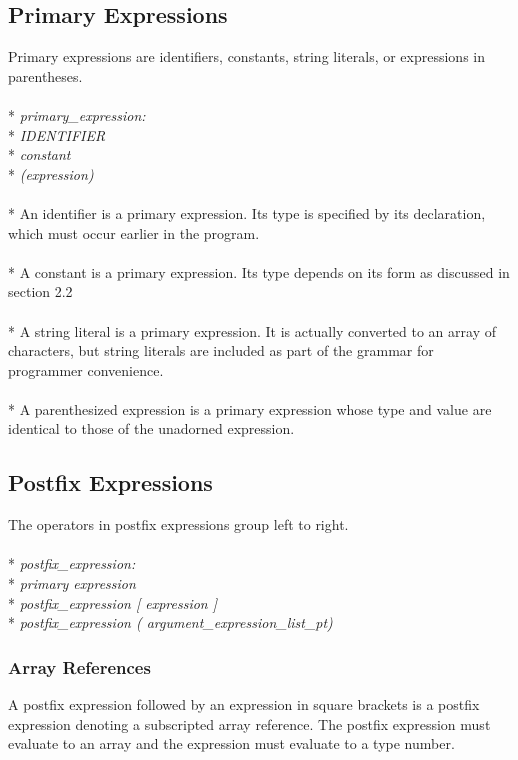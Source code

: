 \documentclass[11pt]{article}
\newcommand{\tab}{\hspace*{2em}}
\begin{document}
\subsection{Primary Expressions}
Primary expressions are identifiers, constants, string literals, or expressions in parentheses.
\\ \\* \tab \emph{primary\_expression:}
\\* \tab \tab \emph{IDENTIFIER}
\\* \tab \tab \emph{constant}
\\* \tab \tab \emph{(expression)}
\\ \\* An identifier is a primary expression. Its type is specified by its declaration, which must occur earlier in the program.
\\ \\* A constant is a primary expression. Its type depends on its form as discussed in section 2.2
\\ \\* A string literal is a primary expression. It is actually converted to an array of characters, but string literals are included as part of the grammar for programmer convenience.    
\\ \\* A parenthesized expression is a primary expression whose type and value are identical to those of the unadorned expression. 

\subsection{Postfix Expressions}
The operators in postfix expressions group left to right.
\\ \\* \tab \emph{postfix\_expression:}
\\* \tab \tab \emph{primary expression}
\\* \tab \tab \emph{postfix\_expression [ expression ]}
\\* \tab \tab \emph{postfix\_expression ( argument\_expression\_list\_pt)}
\subsubsection{Array References}
A postfix expression followed by an expression in square brackets is a postfix expression denoting a subscripted array reference. The postfix expression must evaluate to an array and the expression must evaluate to a type number.
\end{document}
